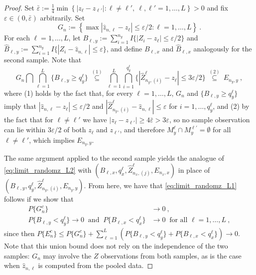 \documentclass[11pt]{article}
\numberwithin{equation}{section}
\begin{document}
\begin{proof}
  Set $\bar\varepsilon:=\frac{1}{4}\min\left\{\left\vert z_{\ell}-z_{\ell'}\right\vert: \ell\not=\ell',~\ell,\ell'=1,\ldots,L\right\}>0$ and fix $\varepsilon\in(0,\bar\varepsilon)$ arbitrarily. Set 
  \[G_{n}:=\left\{\max\left\vert\hat z_{n,\ell}-z_{\ell}\right\vert\leq \varepsilon/2:\ell=1,\ldots,L\right\}~.\]
  For each $\ell=1,\ldots,L$, let $B_{\ell,y}:=\sum_{i=1}^{n_y}I\{|Z_{i}-z_{\ell}|\leq\varepsilon/2\}$ and $\hat B_{\ell,y}:=\sum_{i=1}^{n_y}I\{|Z_{i}-\hat z_{n,\ell}|\leq\varepsilon\}$, and define $B_{\ell,x}$ and $\hat B_{\ell,x}$ analogously for the second sample. Note that
    \begin{equation}
  G_{n}\bigcap\bigcap_{\ell=1}^{L}\{B_{\ell,y}\geq q_{y}^{\ell}\}
  ~\overset{(1)}{\subseteq}~\bigcap_{\ell=1}^{L}\bigcap_{i=1}^{q_y^\ell}
  \{|\hat Z_{n_{y},(i)}^{\ell}-z_{\ell}|\leq 3\varepsilon/2\}
  ~\overset{(2)}{\subseteq}~E_{n_y,y}~,\label{eq:limit_randomz_L2}
  \end{equation}
  where (1) holds by the fact that, for every $\ell=1,\dots,L$, $G_{n}$ and $\{B_{\ell,y}\geq q_{y}^{\ell}\}$ imply that $|\hat z_{n,\ell}-z_{\ell}|\leq \varepsilon/2$ and $|\hat Z_{n_{y},(i)}^{\ell}-\hat z_{n,\ell}|\leq \varepsilon$ for $i=1,\dots,q_y^{\ell}$, and (2) by the fact that for $\ell\not=\ell'$ we have $|z_\ell-z_{\ell'}|\geq 4\bar\varepsilon>3\varepsilon$, so no sample observation can lie within $3\varepsilon/2$ of both $z_\ell$ and $z_{\ell'}$, and therefore $M_y^{\ell}\cap M_y^{\ell'}=\emptyset$ for all $\ell\not=\ell'$, which implies $E_{n_y,y}$.

The same argument applied to the second sample yields the analogue of \eqref{eq:limit_randomz_L2} with $(B_{\ell,x},q_x^\ell,\hat Z_{n_x,(j)}^{\ell},E_{n_x,x})$ in place of $(B_{\ell,y},q_y^\ell,\hat Z_{n_y,(i)}^{\ell},E_{n_y,y})$. From here, we have that \eqref{eq:limit_randomz_L1} follows if we show that
  \begin{align}
  P\{G_{n}^{c}\}&\rightarrow 0~,\label{eq:limit_randomz_L3}\\
  P\{B_{\ell,y}<q_{y}^{\ell}\}\rightarrow 0~\text{ and }~
  P\{B_{\ell,x}<q_{x}^{\ell}\}&\rightarrow 0~\text{ for all }\ell=1,\ldots,L~,
  \label{eq:limit_randomz_L4}
  \end{align}
  since then $P\{E_n^c\}\leq P\{G_n^c\}+\sum_{\ell=1}^{L}\left(P\{B_{\ell,y}<q_y^\ell\} +P\{B_{\ell,x}<q_x^\ell\}\right)\to 0$. Note that this union bound does not rely on the independence of the two samples: $G_n$ may involve the $Z$ observations from both samples, as is the case when $\hat z_{n,\ell}$ is computed from the pooled data.


\end{proof}
\end{document}
